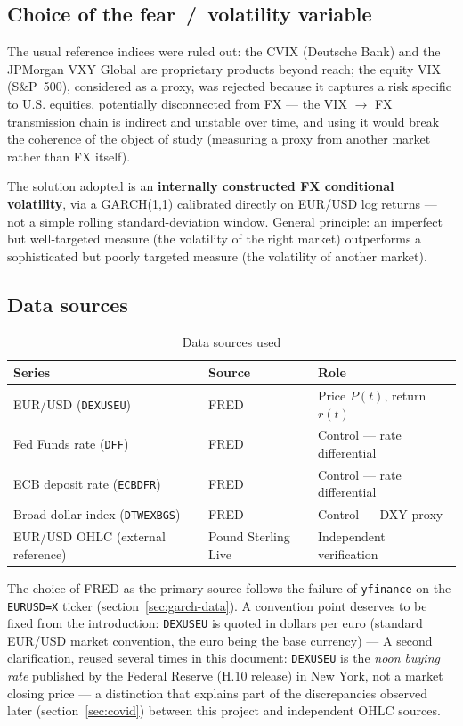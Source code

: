 \documentclass[12pt,a4paper]{article}
\begin{document}
\subsection{Choice of the fear~/~volatility variable}

The usual reference indices were ruled out: the CVIX (Deutsche
Bank) and the JPMorgan VXY Global are proprietary products beyond
reach; the equity VIX (S\&P~500), considered as a proxy, was rejected because it captures a risk specific to U.S. equities,
potentially disconnected from FX --- the VIX
$\rightarrow$ FX transmission chain is indirect and unstable over time, and
using it would break the coherence of the object of study (measuring a proxy from another market rather than FX itself).

The solution adopted is an \textbf{internally constructed FX conditional
	volatility}, via a GARCH(1,1) calibrated directly on EUR/USD log returns --- not a simple rolling standard-deviation window.
General principle: an imperfect but well-targeted measure (the
volatility of the right market) outperforms a sophisticated but poorly
targeted measure (the volatility of another market).

\subsection{Data sources}
\label{sec:data-sources}

\begin{table}[H]
	\centering
	\caption{Data sources used}
	\label{tab:data-sources}
	\begin{tabular}{lll}
		\toprule
		Series & Source & Role \\
		\midrule
		EUR/USD (\texttt{DEXUSEU}) & FRED & Price $P(t)$, return $r(t)$ \\
		Fed Funds rate (\texttt{DFF}) & FRED & Control --- rate differential \\
		ECB deposit rate (\texttt{ECBDFR}) & FRED & Control --- rate differential \\
		Broad dollar index (\texttt{DTWEXBGS}) & FRED & Control --- DXY proxy \\
		EUR/USD OHLC (external reference) & Pound Sterling Live & Independent verification \\
		\bottomrule
	\end{tabular}
\end{table}

\vspace{0.4cm}

The choice of FRED as the primary source follows the failure of
\texttt{yfinance} on the \texttt{EURUSD=X} ticker
(section~\ref{sec:garch-data}). A convention point deserves to be
fixed from the introduction: \texttt{DEXUSEU} is quoted in dollars per
euro (standard EUR/USD market convention, the euro being the base currency) ---  
A second clarification, reused several times in this document:
\texttt{DEXUSEU} is the \emph{noon
	buying rate} published by the Federal Reserve (H.10 release) in New
York, not a market closing price --- a distinction that explains
part of the discrepancies observed later (section~\ref{sec:covid}) between
this project and independent OHLC sources.
\end{document}
